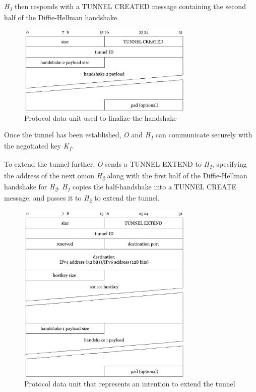 \documentclass{article}
\begin{document}
\textit{H\textsubscript{1}} then responds with a TUNNEL CREATED message containing the second half of the Diffie-Hellman handshake.

\begin{figure}[H]
\centering
     \includegraphics[width=0.75\textwidth]{msg_tunnel_created.pdf}
      \caption{Protocol data unit used to finalize the handshake}
\end{figure}

Once the tunnel has been established, \textit{O} and \textit{H\textsubscript{1}} can communicate securely with the negotiated key \textit{K\textsubscript{1}}.

To extend the tunnel further, \textit{O} sends a TUNNEL EXTEND to \textit{H\textsubscript{1}}, specifying the address of the next onion \textit{H\textsubscript{2}} along with the first half of the Diffie-Hellman handshake for \textit{H\textsubscript{2}}. \textit{H\textsubscript{1}} copies the half-handshake into a TUNNEL CREATE message, and passes it to \textit{H\textsubscript{2}} to extend the tunnel. 

\begin{figure}[H]
\centering
     \includegraphics[width=0.75\textwidth]{msg_tunnel_extend.pdf}
      \caption{Protocol data unit that represents an intention to extend the tunnel}
\end{figure}
\end{document}

